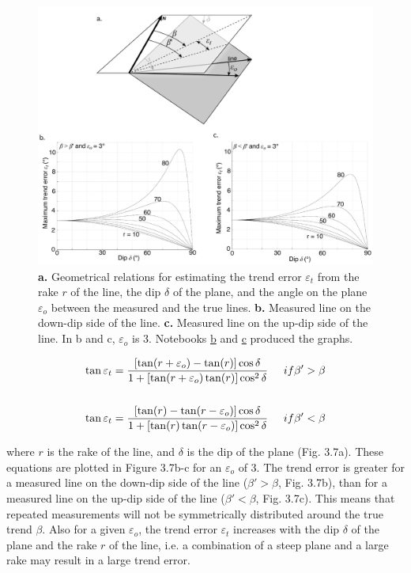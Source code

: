 \documentclass[a4paper , 12pt]{book}
\begin{document}
\begin{figure}[ht]
    \centering
    \includegraphics[width=13cm]{ch3f7.pdf}
    \caption{\textbf{a.} Geometrical relations for estimating the trend error $\varepsilon_t$ from the rake $r$ of the line, the dip $\delta$  of the plane, and the angle on the plane $\varepsilon_o$ between the measured and the true lines. \textbf{b.} Measured line on the down-dip side of the line. \textbf{c.} Measured line on the up-dip side of the line. In b and c, $\varepsilon_o$ is 3\degree. Notebooks \href{https://github.com/nfcd/compGeo/blob/master/source/notebooks/ch3-fig7b.ipynb}{b} and \href{https://github.com/nfcd/compGeo/blob/master/source/notebooks/ch3-fig7c.ipynb}{c} produced the graphs.}
\end{figure}

\begin{equation}
    \begin{gathered}
        \tan\varepsilon_t = \frac{[\tan(r+\varepsilon_o)-\tan(r)]\cos\delta}{1+[\tan(r+\varepsilon_o)\tan(r)]\cos^2\delta} \hspace{0.5cm} if \beta\text{$'$}>\beta\\ \\
        \tan\varepsilon_t = \frac{[\tan(r)-\tan(r-\varepsilon_o)]\cos\delta}{1+[\tan(r)\tan(r-\varepsilon_o)]\cos^2\delta} \hspace{0.5cm} if \beta\text{$'$}<\beta
    \end{gathered}
\end{equation}

where $r$ is the rake of the line, and $\delta$ is the dip of the plane (Fig. 3.7a). These equations are plotted in Figure 3.7b-c for an $\varepsilon_o$ of 3\degree. The trend error is greater for a measured line on the down-dip side of the line ($\beta\text{$'$} > \beta$, Fig. 3.7b), than for a measured line on the up-dip side of the line ($\beta\text{$'$} < \beta$, Fig. 3.7c). This means that repeated measurements will not be symmetrically distributed around the true trend $\beta$. Also for a given $\varepsilon_o$, the trend error $\varepsilon_t$ increases with the dip $\delta$ of the plane and the rake $r$ of the line, i.e. a combination of a steep plane and a large rake may result in a large trend error.
\end{document}
